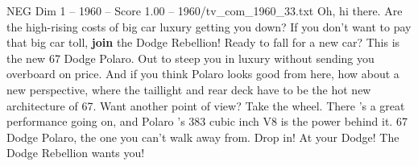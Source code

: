 \begin{textsample}{NEG Dim 1 – 1960 – Score 1.00 – 1960/tv\_com\_1960\_33.txt}  \label{ex:f1_neg_079}
Oh, hi there.
Are the high-rising costs of big car luxury getting you down?
If you don't want to pay that big car toll, \textbf{join} the Dodge Rebellion!
Ready to fall for a new car?
This is the new 67 Dodge Polaro.
Out to steep you in luxury without sending you overboard on price.
And if you think Polaro looks good from here, how about a new perspective, where the taillight and rear deck have to be the hot new architecture of 67.
Want another point of view?
Take the wheel.
There 's a great performance going on, and Polaro 's 383 cubic inch V8 is the power behind it. 67 Dodge Polaro, the one you can't walk away from.
Drop in!
At your Dodge!
The Dodge Rebellion wants you!

\end{textsample}
